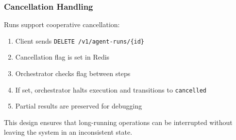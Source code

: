 \subsubsection{Cancellation Handling}

Runs support cooperative cancellation:

\begin{enumerate}
    \item Client sends \texttt{DELETE /v1/agent-runs/\{id\}}
    \item Cancellation flag is set in Redis
    \item Orchestrator checks flag between steps
    \item If set, orchestrator halts execution and transitions to \texttt{cancelled}
    \item Partial results are preserved for debugging
\end{enumerate}

This design ensures that long-running operations can be interrupted without leaving the system in an inconsistent state.

